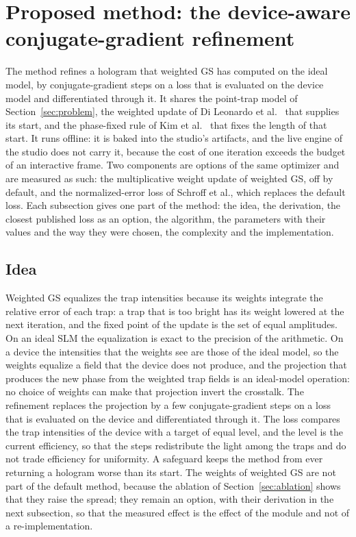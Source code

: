 \section{Proposed method: the device-aware conjugate-gradient refinement}\label{sec:method}

The method refines a hologram that weighted GS has computed on the ideal model, by conjugate-gradient steps on a loss that is evaluated on the device model and differentiated through it. It shares the point-trap model of Section~\ref{sec:problem}, the weighted update of Di Leonardo et al.~\cite{dileonardo} that supplies its start, and the phase-fixed rule of Kim et al.~\cite{kim2019} that fixes the length of that start. It runs offline: it is baked into the studio's artifacts, and the live engine of the studio does not carry it, because the cost of one iteration exceeds the budget of an interactive frame. Two components are options of the same optimizer and are measured as such: the multiplicative weight update of weighted GS, off by default, and the normalized-error loss of Schroff et al., which replaces the default loss. Each subsection gives one part of the method: the idea, the derivation, the closest published loss as an option, the algorithm, the parameters with their values and the way they were chosen, the complexity and the implementation.

\subsection{Idea}\label{sec:idea}

Weighted GS equalizes the trap intensities because its weights integrate the relative error of each trap: a trap that is too bright has its weight lowered at the next iteration, and the fixed point of the update is the set of equal amplitudes. On an ideal SLM the equalization is exact to the precision of the arithmetic. On a device the intensities that the weights see are those of the ideal model, so the weights equalize a field that the device does not produce, and the projection that produces the new phase from the weighted trap fields is an ideal-model operation: no choice of weights can make that projection invert the crosstalk. The refinement replaces the projection by a few conjugate-gradient steps on a loss that is evaluated on the device and differentiated through it. The loss compares the trap intensities of the device with a target of equal level, and the level is the current efficiency, so that the steps redistribute the light among the traps and do not trade efficiency for uniformity. A safeguard keeps the method from ever returning a hologram worse than its start. The weights of weighted GS are not part of the default method, because the ablation of Section~\ref{sec:ablation} shows that they raise the spread; they remain an option, with their derivation in the next subsection, so that the measured effect is the effect of the module and not of a re-implementation.

